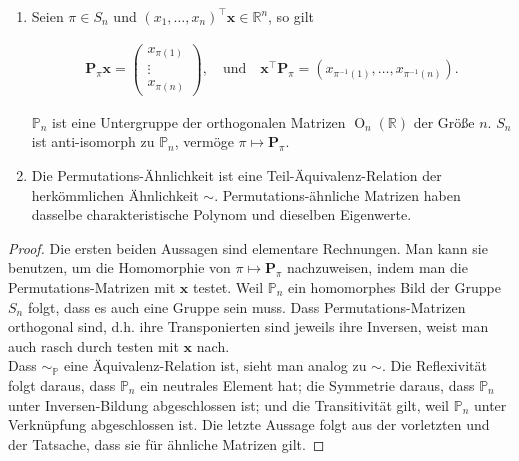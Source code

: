 \begin{lemma} \label{lem:permutation_matrices}

    \phantom{}

    \begin{enumerate}

        \item Seien $\pi \in S_n$ und $(x_1, \dots, x_n)^\top \mathbf x \in \mathbb R^n$, so gilt

        \begin{align*}
            \mathbf P_\pi \mathbf x
            =
            \begin{pmatrix}
                x_{\pi(1)} \\ \vdots \\ x_{\pi(n)}
            \end{pmatrix},
            \quad
            \text{und}
            \quad
            \mathbf x^\top \mathbf P_\pi
            =
            (x_{\pi^{-1}(1)}, \dots, x_{\pi^{-1}(n)}).
        \end{align*}

        $\mathbb P_n$ ist eine Untergruppe der orthogonalen Matrizen $\operatorname O_n(\mathbb R)$ der Größe $n$.
        $S_n$ ist anti-isomorph zu $\mathbb P_n$, vermöge $\pi \mapsto \mathbf P_\pi$.

        \item Die Permutations-Ähnlichkeit ist eine Teil-Äquivalenz-Relation der herkömmlichen Ähnlichkeit $\sim$.
        Permutations-ähnliche Matrizen haben dasselbe charakteristische Polynom und dieselben Eigenwerte.
    
    \end{enumerate}

\end{lemma}

\begin{proof}

    Die ersten beiden Aussagen sind elementare Rechnungen.
    Man kann sie benutzen, um die Homomorphie von $\pi \mapsto \mathbf P_\pi$ nachzuweisen, indem man die Permutations-Matrizen mit $\mathbf x$ testet.
    Weil $\mathbb P_n$ ein homomorphes Bild der Gruppe $S_n$ folgt, dass es auch eine Gruppe sein muss.
    Dass Permutations-Matrizen orthogonal sind, d.h. ihre Transponierten sind jeweils ihre Inversen, weist man auch rasch durch testen mit $\mathbf x$ nach. \\

    Dass $\sim_{\mathbb P}$ eine Äquivalenz-Relation ist, sieht man analog zu $\sim$.
    Die Reflexivität folgt daraus, dass $\mathbb P_n$ ein neutrales Element hat;
    die Symmetrie daraus, dass $\mathbb P_n$ unter Inversen-Bildung abgeschlossen ist;
    und die Transitivität gilt, weil $\mathbb P_n$ unter Verknüpfung abgeschlossen ist.
    Die letzte Aussage folgt aus der vorletzten und der Tatsache, dass sie für ähnliche Matrizen gilt.

\end{proof}

